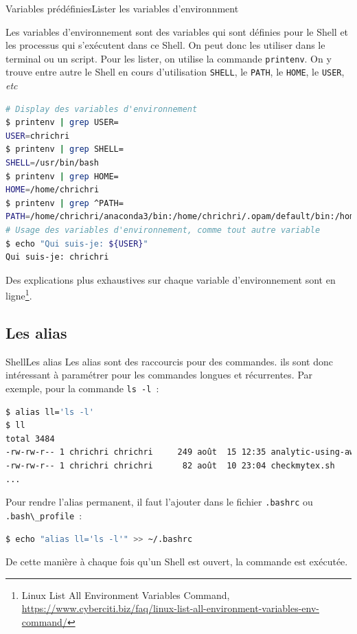 \documentclass{beamer}
\begin{document}
    \begin{frame}[fragile]{Variables prédéfinies}{Lister les variables d'environnment}
        \begin{footnotesize}
            Les variables d'environnement sont des variables qui sont définies pour le Shell et les processus qui s'exécutent dans ce Shell.
            On peut donc les utiliser dans le terminal ou un script.
            \bigbreak
            Pour les lister, on utilise la commande \lstinline{printenv}.
            On y trouve entre autre le Shell en cours d'utilisation \lstinline{SHELL}, le \lstinline{PATH}, le \lstinline{HOME}, le \lstinline{USER}, \textit{etc}
            \begin{lstlisting}[language=bash,basicstyle=\tiny\ttfamily]
# Display des variables d'environnement
$ printenv | grep USER=
USER=chrichri
$ printenv | grep SHELL=
SHELL=/usr/bin/bash
$ printenv | grep HOME=
HOME=/home/chrichri
$ printenv | grep ^PATH=
PATH=/home/chrichri/anaconda3/bin:/home/chrichri/.opam/default/bin:/home/chrichri/.cargo/bin:/home/chrichri/.local/bin:/usr/local/sbin:/usr/local/bin:/usr/sbin:/usr/bin:/sbin:/bin:/usr/games:/usr/local/games:/snap/bin:/snap/bin:/home/chrichri/.dotnet/tools
# Usage des variables d'environnement, comme tout autre variable
$ echo "Qui suis-je: ${USER}"
Qui suis-je: chrichri
            \end{lstlisting}
            Des explications plus exhaustives sur chaque variable d'environnement sont en ligne\footnote{Linux List All Environment Variables Command, \url{https://www.cyberciti.biz/faq/linux-list-all-environment-variables-env-command/}}.
        \end{footnotesize}
    \end{frame}

    \subsection{Les alias}\label{subsec:alias}

    \begin{frame}[fragile]{Shell}{Les alias}
        Les alias sont des raccourcis pour des commandes.
        ils sont donc intéressant à paramétrer pour les commandes longues et récurrentes.
        \bigbreak
        Par exemple, pour la commande \lstinline{ls -l}~:
        \begin{lstlisting}[language=bash]
$ alias ll='ls -l'
$ ll
total 3484
-rw-rw-r-- 1 chrichri chrichri     249 août  15 12:35 analytic-using-awk.sh
-rw-rw-r-- 1 chrichri chrichri      82 août  10 23:04 checkmytex.sh
...
        \end{lstlisting}
        \bigbreak
        Pour rendre l'alias permanent, il faut l'ajouter dans le fichier \lstinline{.bashrc} ou \lstinline{.bash\_profile}~:
        \begin{lstlisting}[language=bash]
$ echo "alias ll='ls -l'" >> ~/.bashrc
        \end{lstlisting}
        De cette manière à chaque fois qu'un Shell est ouvert, la commande est exécutée.
    \end{frame}
\end{document}
